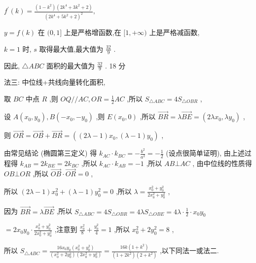\documentclass[10pt]{article}
\begin{document}
\({f}^{\prime }\left( k\right)  = \frac{\left( {1 - {k}^{2}}\right) \left( {2{k}^{4} + 3{k}^{2} + 2}\right) }{{\left( 2{k}^{4} + 5{k}^{2} + 2\right) }^{2}},\)

\(y = f\left( k\right)\) 在 \((0,1\rbrack\) 上是严格增函数,在 \(\lbrack 1, + \infty )\) 上是严格减函数,

\(k = 1\) 时, \(s\) 取得最大值,最大值为 \(\frac{32}{9}\) .

因此, \(\bigtriangleup {ABC}\) 面积的最大值为 \(\frac{32}{9}\) . 18 分

法三: 中位线+共线向量转化面积,

取 \({BC}\) 中点 \(R\) ,则 \({OQ}//{AC},{OR} = \frac{1}{2}{AC}\) ,所以 \({S}_{\bigtriangleup {ABC}} = 4{S}_{\bigtriangleup {OBR}}\) ,

设 \(A\left( {{x}_{0},{y}_{0}}\right) ,B\left( {-{x}_{0}, - {y}_{0}}\right)\) ,则 \(E\left( {{x}_{0},0}\right)\) ,所以 \(\overrightarrow{BR} = \lambda \overrightarrow{BE} = \left( {{2\lambda }{x}_{0},\lambda {y}_{0}}\right)\) ,

则 \(\overrightarrow{OR} = \overrightarrow{OB} + \overrightarrow{BR} = \left( {\left( {{2\lambda } - 1}\right) {x}_{0},\left( {\lambda  - 1}\right) {y}_{0}}\right)\) ,

由常见结论 (椭圆第三定义) 得 \({k}_{AC} \cdot  {k}_{BC} =  - \frac{{b}^{2}}{{a}^{2}} =  - \frac{1}{2}\) (设点很简单证明), 由上述过程得 \({k}_{AB} = 2{k}_{BE} = 2{k}_{BC}\) ,所以 \({k}_{AC} \cdot  {k}_{AB} =  - 1\) ,所以 \({AB} \bot  {AC}\) , 由中位线的性质得 \({OB} \bot  {OR}\) ,所以 \(\overrightarrow{OB} \cdot  \overrightarrow{OR} = 0\) ,

所以 \(\left( {{2\lambda } - 1}\right) {x}_{0}^{2} + \left( {\lambda  - 1}\right) {y}_{0}^{2} = 0\) ,所以 \(\lambda  = \frac{{x}_{0}^{2} + {y}_{0}^{2}}{2{x}_{0}^{2} + {y}_{0}^{2}}\) ,

因为 \(\overrightarrow{BR} = \lambda \overrightarrow{BE}\) ,所以 \({S}_{\bigtriangleup {ABC}} = 4{S}_{\bigtriangleup {OBR}} = {4\lambda }{S}_{\bigtriangleup {OBE}} = {4\lambda } \cdot  \frac{1}{2} \cdot  {x}_{0}{y}_{0}\)

\(= 2{x}_{0}{y}_{0} \cdot  \frac{{x}_{0}^{2} + {y}_{0}^{2}}{2{x}_{0}^{2} + {y}_{0}^{2}}\) ,注意到 \(\frac{{x}_{0}^{2}}{8} + \frac{{y}_{0}^{2}}{4} = 1\) ,所以 \({x}_{0}^{2} + 2{y}_{0}^{2} = 8\) ,

所以 \({S}_{\bigtriangleup {ABC}} = \frac{{16}{x}_{0}{y}_{0}\left( {{x}_{0}^{2} + {y}_{0}^{2}}\right) }{\left( {{x}_{0}^{2} + 2{y}_{0}^{2}}\right) \left( {2{x}_{0}^{2} + {y}_{0}^{2}}\right) } = \frac{{16k}\left( {1 + {k}^{2}}\right) }{\left( {1 + 2{k}^{2}}\right) \left( {2 + {k}^{2}}\right) }\) ,以下同法一或法二.
\end{document}
